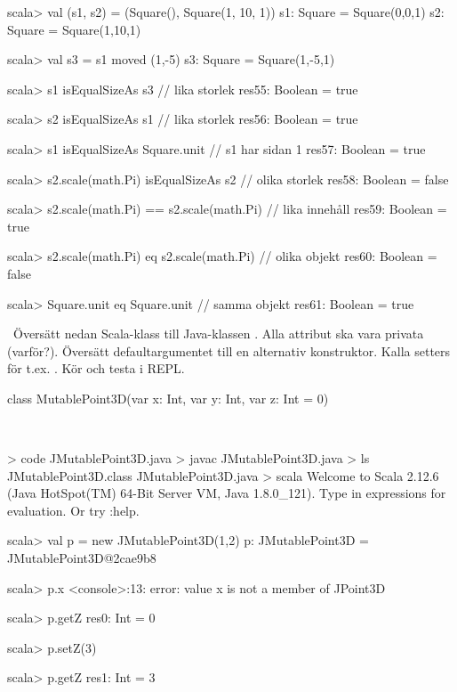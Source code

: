 \SubtaskSolved
\begin{REPL}
scala> val (s1, s2) = (Square(), Square(1, 10, 1))
s1: Square = Square(0,0,1)
s2: Square = Square(1,10,1)

scala> val s3 = s1 moved (1,-5)
s3: Square = Square(1,-5,1)

scala> s1 isEqualSizeAs s3       // lika storlek
res55: Boolean = true

scala> s2 isEqualSizeAs s1       // lika storlek
res56: Boolean = true

scala> s1 isEqualSizeAs Square.unit   // s1 har sidan 1
res57: Boolean = true

scala> s2.scale(math.Pi) isEqualSizeAs s2  // olika storlek
res58: Boolean = false

scala> s2.scale(math.Pi) == s2.scale(math.Pi) // lika innehåll
res59: Boolean = true

scala> s2.scale(math.Pi) eq s2.scale(math.Pi)  // olika objekt
res60: Boolean = false

scala> Square.unit eq Square.unit   // samma objekt
res61: Boolean = true
\end{REPL}

\QUESTEND




\QUESTBEGIN

\Task \what~Översätt nedan Scala-klass till Java-klassen . Alla attribut ska vara privata (varför?). Översätt defaultargumentet till en alternativ konstruktor. Kalla setters för t.ex. . Kör  och testa i REPL.

\begin{Code}
class MutablePoint3D(var x: Int, var y: Int, var z: Int = 0)
\end{Code}

\SOLUTION

\TaskSolved \what~


\begin{REPL}
> code JMutablePoint3D.java
> javac JMutablePoint3D.java
> ls
JMutablePoint3D.class  JMutablePoint3D.java
> scala
Welcome to Scala 2.12.6 (Java HotSpot(TM) 64-Bit Server VM, Java 1.8.0_121).
Type in expressions for evaluation. Or try :help.

scala> val p = new JMutablePoint3D(1,2)
p: JMutablePoint3D = JMutablePoint3D@2cae9b8

scala> p.x
<console>:13: error: value x is not a member of JPoint3D

scala> p.getZ
res0: Int = 0

scala> p.setZ(3)

scala> p.getZ
res1: Int = 3

\end{REPL}

